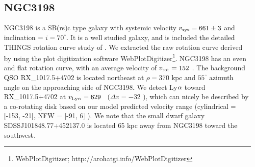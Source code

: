 

\subsection{NGC3198}
NGC3198 is a SB(rs)c type galaxy with systemic velocity $v_{\rm sys} = 661 \pm 3$ \kms and inclination = $i = 70^{\circ}$. It is a well studied galaxy, and is included the detailed THINGS rotation curve study of \cite{deblok2008}. We extracted the raw rotation curve derived by \cite{deblok2008} using the plot digitization software WebPlotDigitizer\footnote{WebPlotDigitizer; http://arohatgi.info/WebPlotDigitizer}. NGC3198 has an even and flat rotation curve, with an average velocity of $v_{\rm rot} = 152$ \kms. The background QSO RX\_1017.5+4702 is located northeast at $\rho = 370$ kpc and $55^{\circ}$ azimuth angle on the approaching side of NGC3198. We detect Ly$\rm \alpha$ toward RX\_1017.5+4702 at $v_{\rm Ly\alpha} = 629$ \kms~($\Delta v = -32$ \kms), which can nicely be described by a co-rotating disk based on our model predicted velocity range (cylindrical = [-153, -21], NFW = [-91, 6] \kms). We note that the small dwarf galaxy SDSSJ101848.77+452137.0 is located 65 kpc away from NGC3198 toward the southwest.








